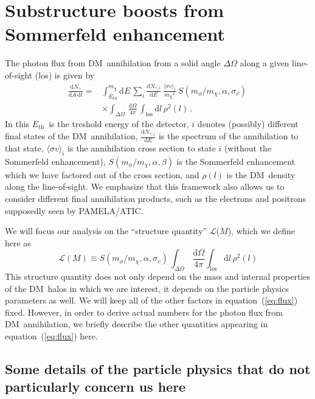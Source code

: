 \documentclass[aps,prd,twocolumn,amsmath,amssymb,floatfix,nofootinbib,10pt]{revtex4}
\newcommand{\DM}{DM}
\newcommand{\somm}{\ensuremath{S}}
\newcommand{\mdm}{\ensuremath{m_{\chi}}}
\newcommand{\mv}{\ensuremath{m_{\phi}}}
\newcommand{\dd}{\mathrm{d}}
\newcommand{\eqnname}{equation}
\newcommand{\Ngamma}{\ensuremath{N_{\gamma}}}
\newcommand{\Ngammai}{\ensuremath{N_{\gamma,i}}}
\newcommand{\Eth}{\ensuremath{E_{\mathrm{th}}}}
\newcommand{\sigmaannv}{\ensuremath{\langle\sigma v\rangle}}
\newcommand{\los}{los}
\newcommand{\sigv}{\ensuremath{\sigma_v}}
\newcommand{\lum}{\ensuremath{\mathcal{L}}}
\begin{document}
\section{Substructure boosts from Sommerfeld enhancement}
The photon flux from \DM\ annihilation from a solid angle
$\Delta\Omega$ along a given line-of-sight (\los) is given by
\begin{equation}\label{eq:flux}
\begin{split}
\frac{\dd \Ngamma}{\dd A \,\dd t}  = &
\int_{\Eth}^{\mdm}\dd E\, \sum_i \frac{\dd
\Ngammai}{\dd E} \,\frac{\sigmaannv_i}{\mdm^2}\,
\somm\left(\mv/\mdm,\alpha,\sigv\right)\,\\
& \times \int_{\Delta\Omega}\,\frac{\dd\Omega}{4\pi}\,\int_{\mathrm{\los}} \dd l\,
\rho^2(l)\, .
\end{split}
\end{equation}
In this \Eth\ is the treshold energy of the detector, $i$ denotes
(possibly) different final states of the \DM\ annihilation, $\frac{\dd
\Ngammai}{\dd E}$ is the spectrum of the annihilation to that state,
$\sigmaannv_i$ is the annihilation cross section to state $i$ (without
the Sommerfeld enhancement), $\somm\left(\mv/\mdm,\alpha,\beta\right)$
is the Sommerfeld enhancement which we have factored out of the cross
section, and $\rho(l)$ is the \DM\ density along the line-of-sight. We
emphasize that this framework also allows us to consider different
final annihilation products, such as the electrons and positrons
supposedly seen by PAMELA/ATIC.


We will focus our analysis on the ``structure quantity'' \lum($M$),
which we define here as
\begin{equation}\label{eq:structquant}
\lum(M)\equiv\somm\left(\mv/\mdm,\alpha,\sigv\right)\,\int_{\Delta\Omega}\,\frac{\dd\Omega}{4\pi}\int_{\mathrm{\los}}
\dd l\, \rho^2(l)
\end{equation}
This structure quantity does not only depend on the mass and internal
properties of the \DM\ halos in which we are interest, it depends on
the particle physics parameters as well. We will keep all of the other
factors in \eqnname\ (\ref{eq:flux}) fixed. However, in order to
derive actual numbers for the photon flux from \DM\ annihilation, we
briefly describe the other quantities appearing in \eqnname\
(\ref{eq:flux}) here.

\subsection{Some details of the particle physics that do not particularly concern us here}\label{sec:partphys}
\end{document}
